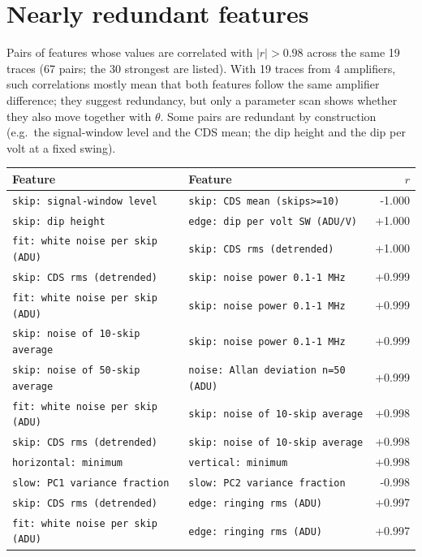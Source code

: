 \documentclass[10pt]{article}
\begin{document}
\section{Nearly redundant features}

Pairs of features whose values are correlated with $|r|>0.98$ across the same 19 traces (67 pairs;
the 30 strongest are listed). With 19 traces from 4 amplifiers, such correlations mostly mean that both features follow the same
amplifier difference; they suggest redundancy, but only a parameter scan shows whether they also move together with $\theta$.
Some pairs are redundant by construction (e.g.\ the signal-window level and the CDS mean; the dip height and the dip per volt at a
fixed swing).

\begin{longtable}{>{\raggedright\arraybackslash}p{}>{\raggedright\arraybackslash}p{}r}
\toprule Feature & Feature & $r$ \\ \midrule \endhead
\bottomrule \endfoot
\texttt{skip: signal-window level} & \texttt{skip: CDS mean (skips\textgreater{}=10)} & -1.000 \\
\texttt{skip: dip height} & \texttt{edge: dip per volt SW (ADU/V)} & +1.000 \\
\texttt{fit: white noise per skip (ADU)} & \texttt{skip: CDS rms (detrended)} & +1.000 \\
\texttt{skip: CDS rms (detrended)} & \texttt{skip: noise power 0.1-1 MHz} & +0.999 \\
\texttt{fit: white noise per skip (ADU)} & \texttt{skip: noise power 0.1-1 MHz} & +0.999 \\
\texttt{skip: noise of 10-skip average} & \texttt{skip: noise power 0.1-1 MHz} & +0.999 \\
\texttt{skip: noise of 50-skip average} & \texttt{noise: Allan deviation n=50 (ADU)} & +0.999 \\
\texttt{fit: white noise per skip (ADU)} & \texttt{skip: noise of 10-skip average} & +0.998 \\
\texttt{skip: CDS rms (detrended)} & \texttt{skip: noise of 10-skip average} & +0.998 \\
\texttt{horizontal: minimum} & \texttt{vertical: minimum} & +0.998 \\
\texttt{slow: PC1 variance fraction} & \texttt{slow: PC2 variance fraction} & -0.998 \\
\texttt{skip: CDS rms (detrended)} & \texttt{edge: ringing rms (ADU)} & +0.997 \\
\texttt{fit: white noise per skip (ADU)} & \texttt{edge: ringing rms (ADU)} & +0.997 \\

\end{longtable}
\end{document}
